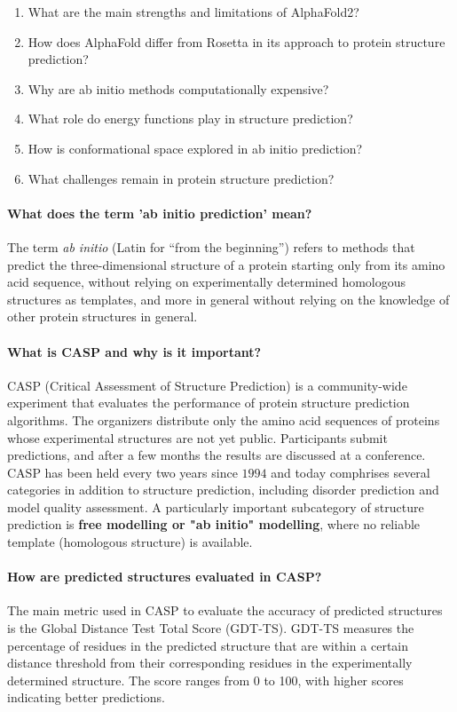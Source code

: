 \begin{enumerate}
\item{What are the main strengths and limitations of AlphaFold2? \done}
\item{How does AlphaFold differ from Rosetta in its approach to protein structure prediction?}
\vspace{0.8em}
\item{Why are ab initio methods computationally expensive?}
\item{What role do energy functions play in structure prediction?}
\item{How is conformational space explored in ab initio prediction?}
\item{What challenges remain in protein structure prediction?}
\end{enumerate}


\paragraph{What does the term 'ab initio prediction' mean?}
The term \emph{ab initio} (Latin for ``from the beginning'') refers to methods that predict the three-dimensional structure of a protein starting only from its amino acid sequence, without relying on experimentally determined homologous structures as templates,
and more in general without relying on the knowledge of other protein structures in general.

\paragraph{What is CASP and why is it important?}
CASP (Critical Assessment of Structure Prediction) is a community-wide experiment that evaluates the performance of protein structure prediction algorithms. 
The organizers distribute only the amino acid sequences of proteins whose experimental structures are not yet public. Participants submit predictions, and after a few months the results are discussed at a conference.
CASP has been held every two years since $1994$  and today comphrises several categories in addition to structure prediction, including disorder prediction and model quality assessment.
A particularly important subcategory of structure prediction is \textbf{free modelling or "ab initio" modelling}, where no reliable template (homologous structure) is available. 


\paragraph{How are predicted structures evaluated in CASP?}
The main metric used in CASP to evaluate the accuracy of predicted structures is the Global Distance Test Total Score (GDT-TS).
GDT-TS measures the percentage of residues in the predicted structure that are within a certain distance threshold from their corresponding residues in the experimentally determined structure. 
The score ranges from 0 to 100, with higher scores indicating better predictions.


